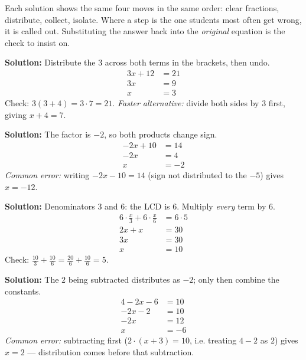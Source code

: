 \documentclass[12pt]{article}
\begin{document}


\noindent\small Each solution shows the same four moves in the same order: clear fractions,
distribute, collect, isolate. Where a step is the one students most often get wrong, it is called
out. Substituting the answer back into the \emph{original} equation is the check to insist on.
\normalsize

\textbf{Solution:} Distribute the $3$ across both terms in the brackets, then undo.
\begin{align*}
3x + 12 &= 21 \\
3x &= 9 \\
x &= 3
\end{align*}
Check: $3(3 + 4) = 3 \cdot 7 = 21$. \emph{Faster alternative:} divide both sides by $3$ first,
giving $x + 4 = 7$.

\textbf{Solution:} The factor is $-2$, so both products change sign.
\begin{align*}
-2x + 10 &= 14 \\
-2x &= 4 \\
x &= -2
\end{align*}
\emph{Common error:} writing $-2x - 10 = 14$ (sign not distributed to the $-5$) gives $x = -12$.

\textbf{Solution:} Denominators $3$ and $6$: the LCD is $6$. Multiply \emph{every} term by $6$.
\begin{align*}
6 \cdot \tfrac{x}{3} + 6 \cdot \tfrac{x}{6} &= 6 \cdot 5 \\
2x + x &= 30 \\
3x &= 30 \\
x &= 10
\end{align*}
Check: $\tfrac{10}{3} + \tfrac{10}{6} = \tfrac{20}{6} + \tfrac{10}{6} = 5$.

\textbf{Solution:} The $2$ being subtracted distributes as $-2$; only then combine the constants.
\begin{align*}
4 - 2x - 6 &= 10 \\
-2x - 2 &= 10 \\
-2x &= 12 \\
x &= -6
\end{align*}
\emph{Common error:} subtracting first ($2 \cdot (x+3) = 10$, i.e. treating $4-2$ as $2$) gives
$x = 2$ --- distribution comes before that subtraction.
\end{document}
